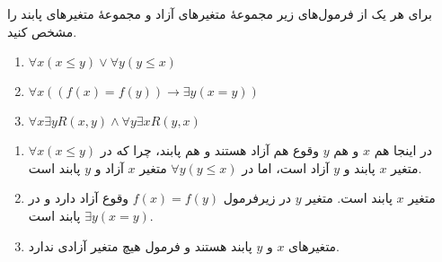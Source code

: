 
	برای هر یک از فرمول‌های زیر مجموعهٔ متغیرهای آزاد و مجموعهٔ متغیرهای پابند را مشخص کنید.
	\begin{enumerate}[label=(\alph*)]
		\item $\forall x (x \leq y) \vee \forall y (y \leq x)$
		\item $\forall x ((f(x) = f(y)) \rightarrow \exists y (x = y))$
		\item $\forall x \exists y R(x, y) \wedge \forall y \exists x R(y, x)$
	\end{enumerate}
	
	\quad\vspace{0.5cm}
	\begin{ans}
		\begin{enumerate}[label = (\alph*)]
			\item در اینجا هم $x$ و  هم $y$ وقوع هم آزاد هستند و هم پابند،
			چرا که در
			$\forall x (x \leq y)$
			متغیر $x$ پابند و $y$ آزاد است، اما در 
			$\forall y (y \leq x)$
			متغیر $x$ آزاد و $y$ پابند است.
			
			\item متغیر $x$ پابند است.
			متغیر $y$ در زیرفرمول
			$f(x) = f(y)$
			وقوع آزاد دارد و در 
			$\exists y (x = y)$
			پابند است.
			
			\item متغیرهای $x$ و $y$ پابند هستند و فرمول هیچ متغیر آزادی ندارد.
		\end{enumerate}
	\end{ans}

